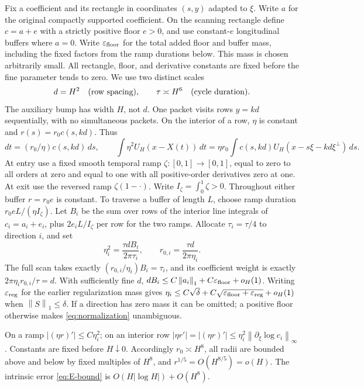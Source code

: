 \documentclass[11pt]{article}
\theoremstyle{remark}\newtheorem{remark}[theorem]{Remark}
\newcommand{\norm}[2]{\left\|#1\right\|_{#2}}
\begin{document}
Fix a coefficient and its rectangle in coordinates $(s,y)$ adapted to $\xi$.
Write $a$ for the original compactly supported coefficient.
On the scanning rectangle define $c=a+e$ with a strictly positive floor
$e>0$, and use constant-$e$ longitudinal buffers where $a=0$.
Write $\varepsilon_{\rm floor}$ for the total added floor and buffer mass,
including the fixed factors from the ramp durations below.
This mass is chosen arbitrarily small.
All rectangle, floor, and derivative constants are fixed before the fine
parameter tends to zero. We use two distinct scales
\begin{equation}\label{eq:scales}
 d=H^2\quad\hbox{(row spacing)},\qquad
 \tau\asymp H^6\quad\hbox{(cycle duration)}.
\end{equation}
The auxiliary bump has width $H$, not $d$. One packet visits rows $y=kd$
sequentially, with no simultaneous packets. On the interior of a row,
$\eta$ is constant and $r(s)=r_0c(s,kd)$. Thus
\[
 dt=(r_0/\eta)c(s,kd)\,ds,
 \qquad\int\eta^2U_H(x-X(t))\,dt
 =\eta r_0\int c(s,kd)U_H(x-s\xi-kd\xi^\perp)\,ds.
\]
At entry use a fixed smooth temporal ramp $\zeta:[0,1]\to[0,1]$,
equal to zero to all orders at zero and equal to one with all positive-order
derivatives zero at one.
At exit use the reversed ramp $\zeta(1-\cdot)$.
Write $I_\zeta=\int_0^1\zeta>0$.
Throughout either buffer $r=r_0e$ is constant.
To traverse a
buffer of length $L$, choose ramp duration
$r_0eL/(\eta I_\zeta)$.
Let $B_i$ be the sum over rows of the interior line
integrals of $c_i=a_i+e_i$, plus $2e_iL/I_\zeta$ per row for the two ramps.
Allocate $\tau_i=\tau/4$ to direction $i$, and set
\begin{equation}\label{eq:normalization}
 \eta_i^2=\frac{\tau dB_i}{2\pi\tau_i},\qquad
 r_{0,i}=\frac{\tau d}{2\pi\eta_i}.
\end{equation}
The full scan takes exactly $(r_{0,i}/\eta_i)B_i=\tau_i$, and its coefficient
weight is exactly $2\pi\eta_ir_{0,i}/\tau=d$. With sufficiently fine $d$,
$dB_i\leq C\norm{a_i}1+C\varepsilon_{\rm floor}+o_H(1)$.
Writing $\varepsilon_{\rm reg}$ for the earlier regularization mass gives
$\eta_i\leq C\sqrt\delta+
C\sqrt{\varepsilon_{\rm floor}+\varepsilon_{\rm reg}}+o_H(1)$
when $\norm S1\leq\delta$.
If a direction
has zero mass it can be omitted; a positive floor otherwise makes
\eqref{eq:normalization} unambiguous.

On a ramp $|(\eta r)'|\leq C\eta_i^2$; on an interior row
$|\eta r'|=|(\eta r)'|\leq\eta_i^2\norm{\partial_\xi\log c_i}\infty$.
Constants are fixed before $H\downarrow0$. Accordingly $r_0\asymp H^8$,
all radii are bounded above and below by fixed multiples of $H^8$, and
$r^{1/5}=O(H^{8/5})=o(H)$. The intrinsic error
\eqref{eq:E-bound} is $O(H|\log H|)+O(H^8)$.
\end{document}
